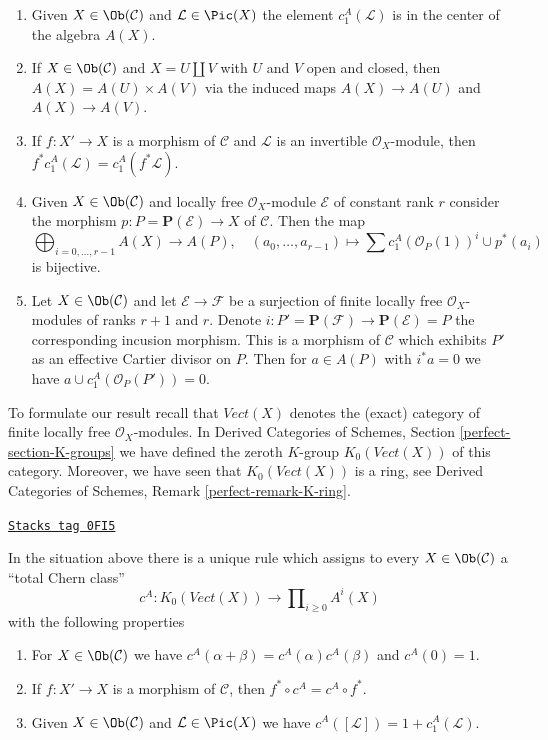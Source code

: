 \begin{enumerate}
\item Given $X \in \Ob(\mathcal{C})$ and $\mathcal{L} \in \Pic(X)$
the element $c_1^A(\mathcal{L})$ is in the center of the algebra $A(X)$.
\item If $X \in \Ob(\mathcal{C})$ and $X = U \amalg V$ with $U$ and $V$
open and closed, then $A(X) = A(U) \times A(V)$ via the induced maps
$A(X) \to A(U)$ and $A(X) \to A(V)$.
\item If $f : X' \to X$ is a morphism of $\mathcal{C}$ and $\mathcal{L}$
is an invertible $\mathcal{O}_X$-module, then $f^*c_1^A(\mathcal{L}) =
c_1^A(f^*\mathcal{L})$.
\item Given $X \in \Ob(\mathcal{C})$ and locally free $\mathcal{O}_X$-module
$\mathcal{E}$ of constant rank $r$ consider the morphism
$p : P = \mathbf{P}(\mathcal{E}) \to X$ of $\mathcal{C}$.
Then the map
$$
\bigoplus\nolimits_{i = 0, \ldots, r - 1} A(X)
\longrightarrow A(P),\quad
(a_0, \ldots, a_{r - 1}) \longmapsto
\sum c_1^A(\mathcal{O}_P(1))^i \cup p^*(a_i)
$$
is bijective.
\item Let $X \in \Ob(\mathcal{C})$ and let $\mathcal{E} \to \mathcal{F}$
be a surjection of finite locally free $\mathcal{O}_X$-modules
of ranks $r + 1$ and $r$. Denote
$i : P' = \mathbf{P}(\mathcal{F}) \to \mathbf{P}(\mathcal{E}) = P$ the
corresponding incusion morphism. This is a morphism of $\mathcal{C}$
which exhibits $P'$ as an effective Cartier divisor on $P$. Then for
$a \in A(P)$ with $i^*a = 0$ we have
$a \cup c_1^A(\mathcal{O}_P(P')) = 0$.
\end{enumerate}
To formulate our result recall that $\textit{Vect}(X)$ denotes the
(exact) category of finite locally free $\mathcal{O}_X$-modules.
In Derived Categories of Schemes, Section \ref{perfect-section-K-groups}
we have defined the zeroth $K$-group
$K_0(\textit{Vect}(X))$ of this category.
Moreover, we have seen that $K_0(\textit{Vect}(X))$ is a ring, see
Derived Categories of Schemes, Remark \ref{perfect-remark-K-ring}.

\begin{proposition}
\label{weil-proposition-chern-class}
\href{https://stacks.math.columbia.edu/tag/0FI5}{\texttt{Stacks tag 0FI5}}

In the situation above there is a unique rule which assigns to
every $X \in \Ob(\mathcal{C})$ a ``total Chern class''
$$
c^A : K_0(\textit{Vect}(X)) \longrightarrow  \prod\nolimits_{i \geq 0} A^i(X)
$$
with the following properties
\begin{enumerate}
\item For $X \in \Ob(\mathcal{C})$ we have
$c^A(\alpha + \beta) = c^A(\alpha) c^A(\beta)$
and $c^A(0) = 1$.
\item If $f : X' \to X$ is a morphism of $\mathcal{C}$, then
$f^* \circ c^A =  c^A \circ f^*$.
\item Given $X \in \Ob(\mathcal{C})$ and $\mathcal{L} \in \Pic(X)$
we have $c^A([\mathcal{L}]) = 1 + c_1^A(\mathcal{L})$.
\end{enumerate}
\end{proposition}

